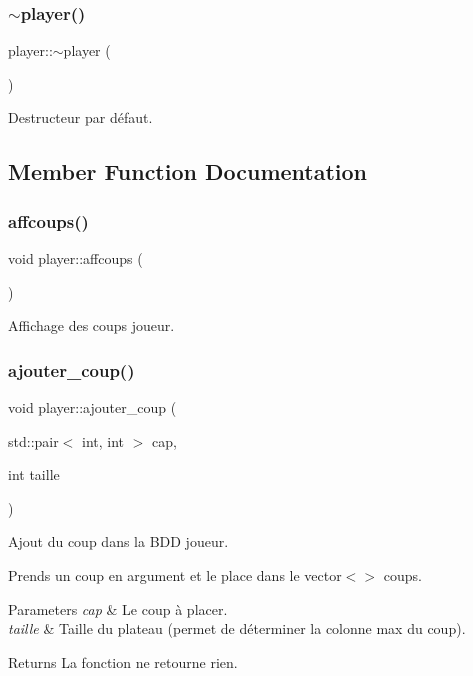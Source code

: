 \subsubsection{\texorpdfstring{$\sim$player()}{~player()}}
{\footnotesize\ttfamily player\+::$\sim$player (\begin{DoxyParamCaption}{ }\end{DoxyParamCaption})}



Destructeur par défaut. 



\subsection{Member Function Documentation}
\mbox{\label{classplayer_a2590189e7416dc8a5cf2686a606f138b}} 
\subsubsection{\texorpdfstring{affcoups()}{affcoups()}}
{\footnotesize\ttfamily void player\+::affcoups (\begin{DoxyParamCaption}{ }\end{DoxyParamCaption})}



Affichage des coups joueur. 

\mbox{\label{classplayer_aec3e561bd70f63c9b1dd0614afc2971a}} 
\subsubsection{\texorpdfstring{ajouter\+\_\+coup()}{ajouter\_coup()}}
{\footnotesize\ttfamily void player\+::ajouter\+\_\+coup (\begin{DoxyParamCaption}\item[{std\+::pair$<$ int, int $>$}]{cap,  }\item[{int}]{taille }\end{DoxyParamCaption})}



Ajout du coup dans la B\+DD joueur. 

Prends un coup en argument et le place dans le vector$<$$>$ coups. 
\begin{DoxyParams}{Parameters}
{\em cap} & Le coup à placer. \\
\hline
{\em taille} & Taille du plateau (permet de déterminer la colonne max du coup). \\
\hline
\end{DoxyParams}
\begin{DoxyReturn}{Returns}
La fonction ne retourne rien. 
\end{DoxyReturn}
\mbox{\label{classplayer_a5eddf905f6904f5737b4f36f7f0ab428}} 
